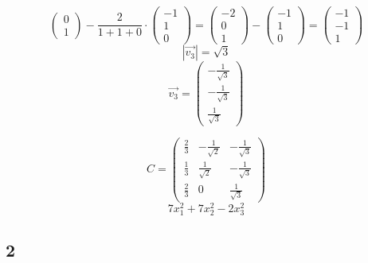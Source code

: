 \begin{itemize}
$$\begin{pmatrix}
        0 \\
        1
    \end{pmatrix} - \frac2{1 + 1 + 0} \cdot
    \begin{pmatrix}
    	-1 \\
        1 \\
        0
    \end{pmatrix} =
    \begin{pmatrix}
    	-2 \\
        0 \\
        1
    \end{pmatrix} -
    \begin{pmatrix}
    	-1 \\
        1 \\
        0
    \end{pmatrix} =
    \begin{pmatrix}
    	-1 \\
        -1 \\
        1
    \end{pmatrix} $$
    $$ |\vec{v_3}| = \sqrt3 $$
    $$ \vec{v_3} =
    \begin{pmatrix}
        -\frac1{\sqrt3} \\
        -\frac1{\sqrt3} \\
        \frac1{\sqrt3}
    \end{pmatrix} $$
\end{itemize}
$$ C =
\begin{pmatrix}
    \frac23 & -\frac1{\sqrt2} & -\frac1{\sqrt3} \\
    \frac13 & \frac1{\sqrt2} & -\frac1{\sqrt3} \\
    \frac23 & 0 & \frac1{\sqrt3}
\end{pmatrix} $$
$$ 7x_1^2 + 7x_2^2 - 2x_3^2 $$

\subsection{2}

